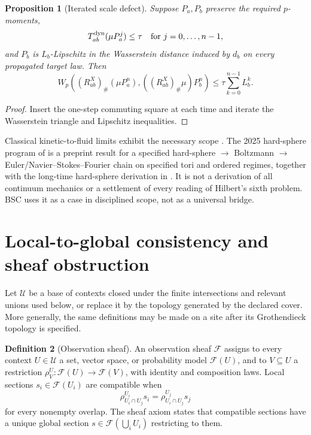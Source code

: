 \documentclass[11pt,a4paper]{article}
\theoremstyle{definition}
\newtheorem{definition}{Definition}[section]
\theoremstyle{plain}
\newtheorem{proposition}[definition]{Proposition}
\theoremstyle{remark}
\newcommand{\push}{_{\#}}
\begin{document}
\begin{proposition}[Iterated scale defect]\label{prop:scaleiterate}
Suppose \(P_a,P_b\) preserve the required \(p\)-moments,
\[
T^{\rm dyn}_{ab}(\mu P_a^j)\le\tau
\quad\text{for }j=0,\ldots,n-1,
\]
and \(P_b\) is \(L_b\)-Lipschitz in the Wasserstein distance induced by
\(d_b\) on every propagated target law.  Then
\[
W_p\!\left((R_{ab}^X)\push(\mu P_a^n),
((R_{ab}^X)\push\mu)P_b^n\right)
\le\tau\sum_{k=0}^{n-1}L_b^k.
\]
\end{proposition}
\begin{proof}
Insert the one-step commuting square at each time and iterate the
Wasserstein triangle and Lipschitz inequalities.
\end{proof}

Classical kinetic-to-fluid limits exhibit the necessary scope
\citep{bardosgolselevermore1993,golsesaintraymond2004}.  The 2025 hard-sphere
program of \citet{denghanima2025} is a preprint result for a specified
hard-sphere \(\to\) Boltzmann \(\to\) Euler/Navier--Stokes--Fourier chain on
specified tori and ordered regimes, together with the long-time hard-sphere
derivation in \citet{denghanima2024}.  It is not a derivation of all continuum
mechanics or a settlement of every reading of Hilbert's sixth problem.  BSC
uses it as a case in disciplined scope, not as a universal bridge.

\section{Local-to-global consistency and sheaf obstruction}\label{sec:sheaf}

Let \(\mathcal U\) be a base of contexts closed under the finite intersections
and relevant unions used below, or replace it by the topology generated by the
declared cover.  More generally, the same definitions may be made on a site
after its Grothendieck topology is specified.

\begin{definition}[Observation sheaf]\label{def:sheaf}
An observation sheaf \(\mathscr F\) assigns to every context
\(U\in\mathcal U\) a set, vector space, or probability model
\(\mathscr F(U)\), and to \(V\subseteq U\) a restriction
\(\rho^U_V:\mathscr F(U)\to\mathscr F(V)\), with identity and composition
laws.  Local sections \(s_i\in\mathscr F(U_i)\) are compatible when
\[
\rho^{U_i}_{U_i\cap U_j}s_i
=\rho^{U_j}_{U_i\cap U_j}s_j
\]
for every nonempty overlap.  The sheaf axiom states that compatible sections
have a unique global section \(s\in\mathscr F(\bigcup_iU_i)\) restricting to
them.
\end{definition}
\end{document}
